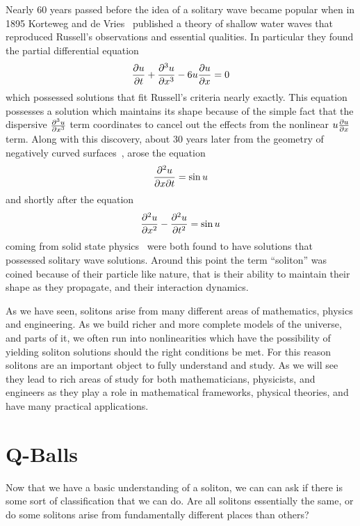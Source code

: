 Nearly 60 years passed before the idea of a solitary wave became popular when
in 1895 Korteweg and de Vries~\cite{KDV} published a theory of shallow water
waves that reproduced Russell's observations and essential qualities. In
particular they found the partial differential equation
\begin{equation}
    \pdv{u}{t} + \pdv[3]{u}{x} - 6 u \pdv{u}{x} = 0
\end{equation}
which possessed solutions that fit Russell's criteria nearly exactly. This
equation possesses a solution which maintains its shape because of the simple
fact that the dispersive \(\pdv[3]{u}{x}\) term coordinates to cancel out the
effects from the nonlinear \(u\pdv{u}{x}\) term. Along with this discovery,
about 30 years later from the geometry of negatively curved
surfaces~\cite{curvedsurf}, arose the equation
\begin{equation}
    \pdv[2]{u}{x}{t} = \sin{u}
\end{equation}
and shortly after the equation
\begin{equation}
    \pdv[2]{u}{x} - \pdv[2]{u}{t} = \sin{u}
\end{equation}
coming from solid state physics~\cite{sinegordon} were both found to have
solutions that possessed solitary wave solutions. Around this point the term
``soliton'' was coined because of their particle like nature, that is their
ability to maintain their shape as they propagate, and their interaction
dynamics.

As we have seen, solitons arise from many different areas of mathematics,
physics and engineering. As we build richer and more complete models of the
universe, and parts of it, we often run into nonlinearities which have the
possibility of yielding soliton solutions should the right conditions be met.
For this reason solitons are an important object to fully understand and study.
As we will see they lead to rich areas of study for both mathematicians,
physicists, and engineers as they play a role in mathematical frameworks,
physical theories, and have many practical applications.

\section{Q-Balls}\label{sec:qballintro}
Now that we have a basic understanding of a soliton, we can can ask if there is
some sort of classification that we can do. Are all solitons essentially the
same, or do some solitons arise from fundamentally different places than others?

